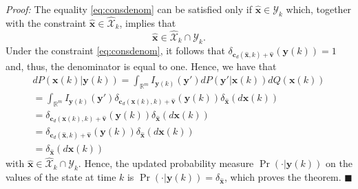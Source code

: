 \documentclass[twocolumn]{autart}
\newenvironment*{proof}{\emph{Proof:}}{}
\newcommand*{\qued}{\hfill\ensuremath{\blacksquare}}
\begin{document}
\begin{proof}
The  equality  \eqref{eq:consdenom} can be satisfied only if $\hat{\mathbf{x}} \in \mathcal{Y}_{k}$ which, together with the constraint $\hat{\mathbf{x}}\in \mathcal{\hat{X}}_k$,
implies that
$$
\hat{\mathbf{x}} \in {\hat{\mathcal{X}}_{k}} \cap \mathcal{Y}_{k}.
$$
Under the constraint \eqref{eq:consdenom},  it follows that $\delta_{\mathbf{c}_d(\hat{\mathbf{x}},k)+\mathbf{\hat{v}}}(\mathbf{y}(k))=1$ and, thus,  the denominator is equal to one.
Hence, we have that
$$
\begin{array}{l}
dP(\mathbf{x}(k)|\mathbf{y}(k))=\int_{\mathbb{R}^m} I_{\mathbf{y}(k)}(\mathbf{y}')dP(\mathbf{y}'|\mathbf{x}(k))dQ(\mathbf{x}(k))\\
=\int_{\mathbb{R}^m} I_{\mathbf{y}(k)}(\mathbf{y}')\delta_{\mathbf{c}_d(\mathbf{x}(k),k)+\mathbf{\hat{v}}}(\mathbf{y}(k))\delta_{\hat{\mathbf{x}}}(d\mathbf{x}(k))\\
=\delta_{\mathbf{c}_d(\mathbf{x}(k),k)+\mathbf{\hat{v}}}(\mathbf{y}(k))\delta_{\hat{\mathbf{x}}}(d\mathbf{x}(k))\\
=\delta_{\mathbf{c}_d(\hat{\mathbf{x}},k)+\mathbf{\hat{v}}}(\mathbf{y}(k))\delta_{\hat{\mathbf{x}}}(d\mathbf{x}(k))\\
=\delta_{\hat{\mathbf{x}}}(d\mathbf{x}(k))
\end{array}
$$
with $\hat{\mathbf{x}} \in {\hat{\mathcal{X}}_{k}} \cap \mathcal{Y}_{k}$. Hence, the updated probability measure $\Pr(\cdot|\mathbf{y}(k))$
on the values of the state at time $k$ is $\Pr(\cdot|\mathbf{y}(k))= \delta_{\hat{\mathbf{x}}}$, which proves the theorem. \qued
\end{proof}
\end{document}
